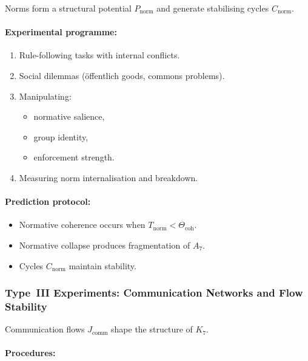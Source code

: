 Norms form a structural potential $P_{\mathrm{norm}}$ and 
generate stabilising cycles $C_{\mathrm{norm}}$.

\paragraph{Experimental programme:}

\begin{enumerate}
    \item Rule-following tasks with internal conflicts.
    \item Social dilemmas (öffentlich goods, commons problems).
    \item Manipulating:
          \begin{itemize}
              \item normative salience,
              \item group identity,
              \item enforcement strength.
          \end{itemize}
    \item Measuring norm internalisation and breakdown.
\end{enumerate}

\paragraph{Prediction protocol:}

\begin{itemize}
    \item Normative coherence occurs when 
          $T_{\mathrm{norm}} < \Theta_{\mathrm{coh}}$.
    \item Normative collapse produces fragmentation of $A_7$.
    \item Cycles $C_{\mathrm{norm}}$ maintain stability.
\end{itemize}



\subsubsection{Type~III Experiments: Communication Networks and Flow Stability}

Communication flows $J_{\mathrm{comm}}$ shape the structure of $K_7$.

\paragraph{Procedures:}

